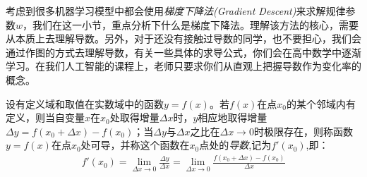 \documentclass[12pt]{article}
\numberwithin{figure}{section}
\numberwithin{equation}{section}
\begin{document}
考虑到很多机器学习模型中都会使用\textit{梯度下降法(Gradient Descent)}来求解规律参数$w$，我们在这一小节，重点分析下什么是梯度下降法。理解该方法的核心，需要从本质上去理解导数。另外，对于还没有接触过导数的同学，也不要担心，我们会通过作图的方式去理解导数，有关一些具体的求导公式，你们会在高中数学中逐渐学习。在我们人工智能的课程上，老师只要求你们从直观上把握导数作为变化率的概念。

\begin{definition}
	设有定义域和取值在实数域中的函数$y=f(x)$。若$f(x)$在点$x_0$的某个邻域内有定义，则当自变量$x$在$x_0$处取得增量$\Delta x$时，$y$相应地取得增量$\Delta y = f(x_0 + \Delta x) - f(x_0)$；当$\Delta y$与$\Delta x$之比在$\Delta x \to 0$时极限存在，则称函数$y=f(x)$在点$x_0$处可导，并称这个函数在$x_0$点处的\textit{导数},记为$f'(x_0)$,即：
	\begin{align*}
		f'(x_0) = \lim_{\Delta x \to 0} \frac{\Delta y}{\Delta x} = \lim_{\Delta x \to 0} \frac{f(x_0 + \Delta x) - f(x_0)}{\Delta x}
	\end{align*}
\end{definition}
\end{document}
